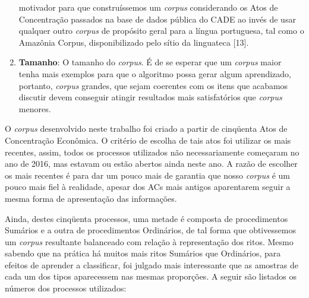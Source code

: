 \documentclass[11pt]{report}
\begin{document}
\begin{enumerate}[label=\textbf{\arabic*.}]
  motivador para que construíssemos um \textit{corpus} considerando os Atos de Concentração passados na base de dados pública do CADE ao invés de usar qualquer outro \textit{corpus} de propósito
  geral para a língua portuguesa, tal como o Amazônia Corpus, disponibilizado pelo sítio da linguateca [13].
  \item \textbf{Tamanho}: O tamanho do \textit{corpus}. É de se esperar que um \textit{corpus} maior tenha mais exemplos para que o algoritmo possa gerar algum aprendizado, portanto, \textit{corpus} grandes,
  que sejam coerentes com os itens que acabamos discutir devem conseguir atingir resultados mais satisfatórios que \textit{corpus} menores.
\end{enumerate}

O \textit{corpus} desenvolvido neste trabalho foi criado a partir de cinqüenta Atos de Concentração Econômica. O critério de escolha de tais atos foi utilizar os mais recentes, assim,
todos os processos utilizados não necessariamente começaram no ano de 2016, mas estavam ou estão abertos ainda neste ano. A razão de escolher os mais recentes é para dar um pouco
mais de garantia que nosso \textit{corpus} é um pouco mais fiel à realidade, apesar dos ACs mais antigos aparentarem seguir a mesma forma de apresentação das informações.

Ainda, destes cinqüenta processos, uma metade é composta de procedimentos Sumários e a outra de procedimentos Ordinários, de tal forma que obtivessemos um \textit{corpus} resultante balanceado
com relação à representação dos ritos. Mesmo sabendo que na prática há muitos mais ritos Sumários que Ordinários, para efeitos de aprender a classificar, foi julgado mais
interessante que as amostras de cada um dos tipos aparecessem nas mesmas proporções. A seguir são listados os números dos processos utilizados:
\end{document}
